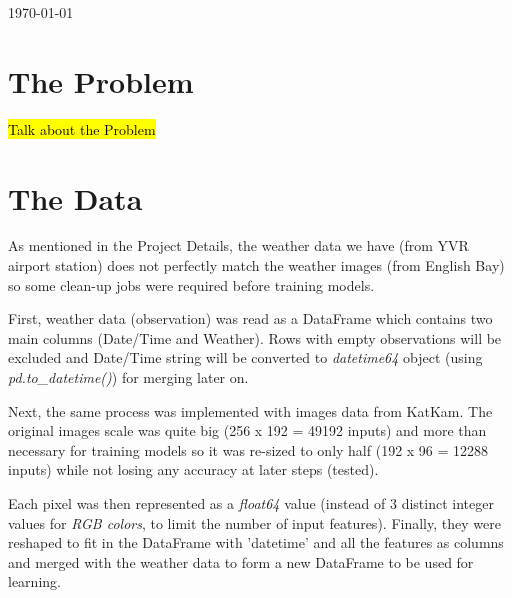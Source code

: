 \begin{titlepage}

{\large \today}\\[2cm] %


 

\vfill %

\end{titlepage}

\section{The Problem}

\hl{Talk about the Problem}

\section{The Data}

As mentioned in the Project Details, the weather data we have (from YVR airport station) does not perfectly match the weather images (from English Bay) so some clean-up jobs were required before training models. 

First, weather data (observation) was read as a DataFrame which contains two main columns (Date/Time and Weather). Rows with empty observations will be excluded and Date/Time string will be converted to \textit{datetime64} object (using \textit{pd.to\_datetime()}) for merging later on.

Next, the same process was implemented with images data from KatKam. The original images scale was quite big (256 x 192 = 49192 inputs) and more than necessary for training models so it was re-sized to only half (192 x 96 = 12288 inputs) while not losing any accuracy at later steps (tested). 

Each pixel was then represented as a \textit{float64} value (instead of 3 distinct integer values for \textit{RGB colors}, to limit the number of input features). Finally, they were reshaped to fit in the DataFrame with 'datetime' and all the features as columns and merged with the weather data to form a new DataFrame to be used for learning.


